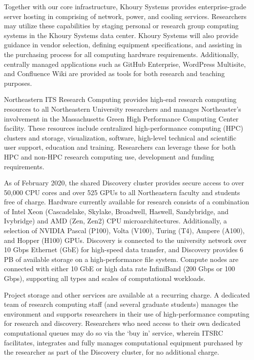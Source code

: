 Together with our core infrastructure, Khoury Systems provides enterprise-grade server hosting in comprising of network, power, and cooling services. Researchers may utilize these capabilities by staging personal or research group computing systems in the Khoury Systems data center. Khoury Systems will also provide guidance in vendor selection, defining equipment specifications, and assisting in the purchasing process for all computing hardware requirements. Additionally, centrally managed applications such as GitHub Enterprise, WordPress Multisite, and Confluence Wiki are provided as tools for both research and teaching purposes. 

\noindent
Northeastern ITS Research Computing provides high-end research computing resources to all Northeastern University researchers and manages Northeaster’s involvement in the Massachusetts Green High Performance Computing Center facility. These resources include centralized high-performance computing (HPC) clusters and storage, visualization, software, high-level technical and scientific user support, education and training. Researchers can leverage these for both HPC and non-HPC research computing use, development and funding requirements. 

As of February 2020, the shared Discovery cluster provides secure access to over 50,000 CPU cores and over 525 GPUs to all Northeastern faculty and students free of charge. Hardware currently available for research consists of a combination of Intel Xeon (Cascadelake, Skylake, Broadwell, Haswell, Sandybridge, and Ivybridge) and AMD (Zen, Zen2) CPU microarchitectures. Additionally, a selection of NVIDIA Pascal (P100), Volta (V100), Turing (T4), Ampere (A100), and Hopper (H100) GPUs. Discovery is connected to the university network over 10 Gbps Ethernet (GbE) for high-speed data transfer, and Discovery provides 6 PB of available storage on a high-performance file system. Compute nodes are connected with either 10 GbE or high data rate InfiniBand (200 Gbps or 100 Gbps), supporting all types and scales of computational workloads.

Project storage and other services are available at a recurring charge.  A dedicated team of research computing staff (and several graduate students) manages the environment and supports researchers in their use of high-performance computing for research and discovery.  
Researchers who need access to their own dedicated computational queues may do so via the ‘buy in’ service, wherein ITSRC facilitates, integrates and fully manages computational equipment purchased by the researcher as part of the Discovery cluster, for no additional charge.  


